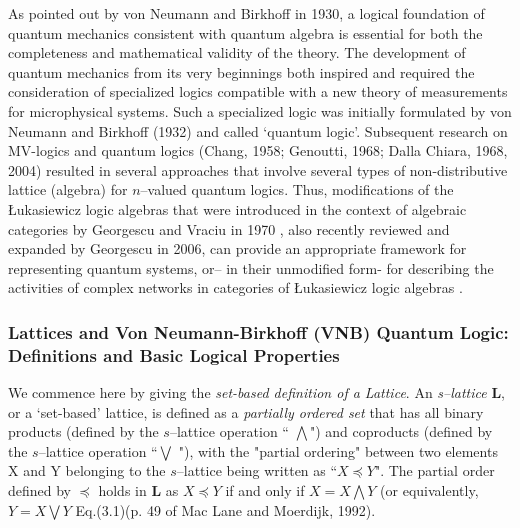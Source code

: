 \documentclass[12pt]{article}
\theoremstyle{plain}
\theoremstyle{definition}
\theoremstyle{plain}
\numberwithin{equation}{section}
\begin{document}
 As pointed out by von Neumann and Birkhoff in 1930, a logical foundation of quantum mechanics consistent with quantum algebra is essential for both the completeness and mathematical validity of the theory. The development of quantum mechanics from its very beginnings both inspired and required the consideration of specialized logics compatible with a new theory of measurements for microphysical systems. Such a specialized logic was initially formulated by von Neumann and Birkhoff (1932) and called `quantum logic'. Subsequent research on MV-logics and quantum logics (Chang, 1958;
Genoutti, 1968; Dalla Chiara, 1968, 2004) resulted in several approaches that involve several types of non-distributive lattice (algebra) for $n$--valued quantum logics. Thus, modifications of the \L ukasiewicz logic algebras that were introduced in the context of algebraic categories by Georgescu and Vraciu in 1970 \cite{GGCV70}, also recently reviewed and expanded by Georgescu in 2006, can provide an appropriate framework for representing quantum systems, or-- in their unmodified form- for describing the activities of complex networks in categories of \L{}ukasiewicz logic algebras \cite{ICB77}.

\subsubsection{Lattices and Von Neumann-Birkhoff (VNB) Quantum Logic: Definitions and Basic Logical Properties}
We commence here by giving the \emph{set-based definition of a Lattice}. An \emph{s--lattice} $\mathbf{L}$, or a `set-based' lattice, is defined as a \emph{partially ordered set} that has all
binary products (defined by the $s$--lattice operation ``
$\bigwedge$") and coproducts (defined by the $s$--lattice
operation ``$ \bigvee$ "), with the "partial ordering" between two
elements X and Y belonging to the $s$--lattice being written as
``$X \preceq Y$". The partial order defined by $\preceq$ holds in
\textbf{L }as $X \preceq  Y$ if and only if
 $X = X \bigwedge Y $ (or equivalently, $Y = X \bigvee Y $
Eq.(3.1)(p. 49 of Mac Lane and Moerdijk, 1992).
\end{document}
